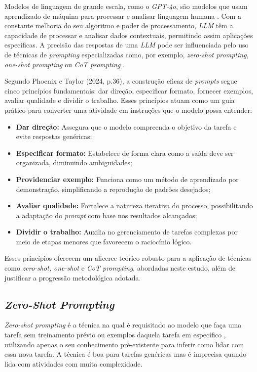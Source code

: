 \documentclass[12pt]{article}
\begin{document}
Modelos de linguagem de grande escala, como o \textit{GPT-4o}, são modelos que usam aprendizado de máquina para processar e analisar linguagem humana \cite{misc2}. Com a constante melhoria do seu algoritmo e poder de processamento, \textit{LLM} têm a capacidade de processar e analisar dados contextuais, permitindo assim aplicações específicas. A precisão das respostas de uma \textit{LLM} pode ser influenciada pelo uso de técnicas de \textit{prompting} especializadas como, por exemplo, \textit{zero-shot prompting}, \textit{one-shot prompting} ou \textit{CoT prompting} \cite{misc3}.

Segundo Phoenix e Taylor (2024, p.36), a construção eficaz de \textit{prompts} segue cinco princípios fundamentais: dar direção, especificar formato, fornecer exemplos, avaliar qualidade e dividir o trabalho. Esses princípios atuam como um guia prático para converter uma atividade em instruções que o modelo possa entender: 

    \begin{itemize}
        \item \textbf{Dar direção:} Assegura que o modelo compreenda o objetivo da tarefa e evite respostas genéricas;
        \item \textbf{Especificar formato:} Estabelece de forma clara como a saída deve ser organizada, diminuindo ambiguidades;
        \item \textbf{Providenciar exemplo:} Funciona como um método de aprendizado por demonstração, simplificando a reprodução de padrões desejados;
        \item \textbf{Avaliar qualidade:} Fortalece a natureza iterativa do processo, possibilitando a adaptação do \textit{prompt} com base nos resultados alcançados;
        \item \textbf{Dividir o trabalho:} Auxilia no gerenciamento de tarefas complexas por meio de etapas menores que favorecem o raciocínio lógico.
    \end{itemize}

Esses princípios oferecem um alicerce teórico robusto para a aplicação de técnicas como \textit{zero-shot, one-shot} e \textit{CoT prompting}, abordadas neste estudo, além de justificar a progressão metodológica adotada.

\subsection{\textit{Zero-Shot Prompting}}

\textit{Zero-shot prompting} é a técnica na qual é requisitado ao modelo que faça uma tarefa sem treinamento prévio ou exemplos daquela tarefa em específico \cite{misc4}, utilizando apenas o seu conhecimento pré-existente para inferir como lidar com essa nova tarefa. A técnica é boa para tarefas genéricas mas é imprecisa quando lida com atividades com muita complexidade.
\end{document}
